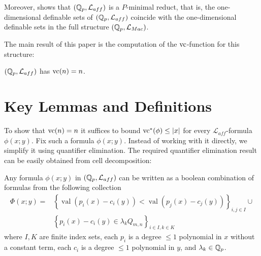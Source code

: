 \documentclass{amsart}
\renewcommand{\LL}{\mathcal L}
\newcommand{\LLM}{\mathcal L_{Mac}}
\newcommand{\curly}[1]{\left\{#1\right\}}
\DeclareMathOperator{\vval}{val}
\begin{document}
Moreover, \cite{reduct} shows that $(\Q_p, \LL_{aff})$ is a $P$-minimal reduct,
that is, the one-dimensional definable sets of $(\Q_p, \LL_{aff})$ coincide with the one-dimensional definable sets in the full structure $(\Q_p, \LLM)$.

The main result of this paper is the computation of the $\operatorname{vc}$-function for this structure:
\begin{Theorem} \label{main_theorem}
  $(\Q_p, \LL_{aff})$ has $\operatorname{vc}(n) = n$.
\end{Theorem}


\section{Key Lemmas and Definitions}




To show that $\operatorname{vc}(n) = n$ it suffices to bound $\operatorname{vc}^*(\phi) \leq |x|$ for every $\LL_{aff}$-formula $\phi(x; y)$.
Fix such a formula $\phi(x; y)$.
Instead of working with it directly, we simplify it using quantifier elimination.
The required quantifier elimination result can be easily obtained from cell decomposition:
\begin{Lemma} \label{quantifier_elimination}
  Any formula $\phi(x; y)$ in $(\Q_p, \LL_{aff})$ can be written as a boolean combination of formulas from the following collection
  \begin{align*}
    \Phi(x; y) = &\curly{\vval (p_i(x) - c_i(y)) < \vval (p_j(x) - c_j(y))}_{i, j \in I} \cup \\
                 &\curly{p_i(x) - c_i(y) \in \lambda_k Q_{m,n}}_{i \in I , k \in K}
  \end{align*}
  where $I, K$ are finite index sets,
  each $p_i$ is a degree $\leq 1$ polynomial in $x$ without a constant term,
  each $c_i$ is a degree $\leq 1$ polynomial in $y$, and
  $\lambda_k \in \mathbb{Q}_p$.
\end{Lemma}
\end{document}
